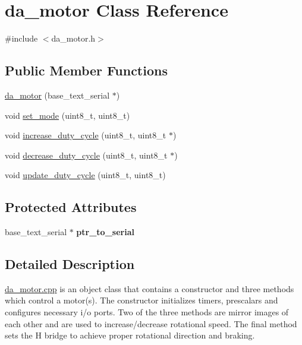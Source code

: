 \hypertarget{classda__motor}{\section{da\-\_\-motor Class Reference}
\label{classda__motor}
}


{\ttfamily \#include $<$da\-\_\-motor.\-h$>$}

\subsection*{Public Member Functions}
\begin{DoxyCompactItemize}
\item 
\hyperlink{classda__motor_acba4d745274fff811dd6bdfd2ce2e311}{da\-\_\-motor} (base\-\_\-text\-\_\-serial $\ast$)
\item 
void \hyperlink{classda__motor_ae12199588a759b98121382bfa65470cb}{set\-\_\-mode} (uint8\-\_\-t, uint8\-\_\-t)
\item 
void \hyperlink{classda__motor_aaf09074463c510eccc78f22f7df9420e}{increase\-\_\-duty\-\_\-cycle} (uint8\-\_\-t, uint8\-\_\-t $\ast$)
\item 
void \hyperlink{classda__motor_ac721f9ffd52d2ac163709eb4959ddaff}{decrease\-\_\-duty\-\_\-cycle} (uint8\-\_\-t, uint8\-\_\-t $\ast$)
\item 
void \hyperlink{classda__motor_a4327ab2965cece1442288893ec880e0c}{update\-\_\-duty\-\_\-cycle} (uint8\-\_\-t, uint8\-\_\-t)
\end{DoxyCompactItemize}
\subsection*{Protected Attributes}
\begin{DoxyCompactItemize}
\item 
\hypertarget{classda__motor_a31d8bcb129ad32f429176f4c04e8a572}{base\-\_\-text\-\_\-serial $\ast$ {\bfseries ptr\-\_\-to\-\_\-serial}}\label{classda__motor_a31d8bcb129ad32f429176f4c04e8a572}

\end{DoxyCompactItemize}


\subsection{Detailed Description}
\hyperlink{da__motor_8cpp}{da\-\_\-motor.\-cpp} is an object class that contains a constructor and three methods which control a motor(s). The constructor initializes timers, prescalars and configures necessary i/o ports. Two of the three methods are mirror images of each other and are used to increase/decrease rotational speed. The final method sets the H bridge to achieve proper rotational direction and braking. 

